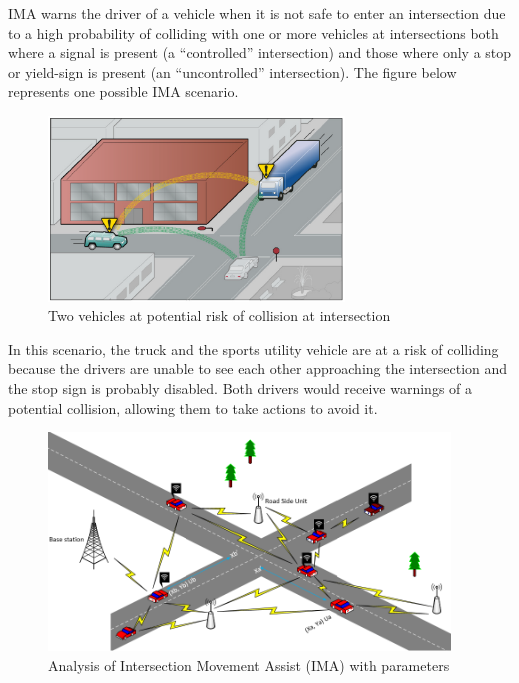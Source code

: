 \documentclass[12pt]{report}
\begin{document}
IMA warns the driver of a vehicle when it is not safe to enter an intersection due to a high probability of colliding with one or more vehicles at intersections both where a signal is present (a “controlled” intersection) and those where only a stop or yield-sign is present (an “uncontrolled” intersection). The figure below represents one possible IMA scenario.


\begin{figure}[!ht]
	\hfill\includegraphics[width=0.7\textwidth]{wow.png}\hspace*{\fill}
	\caption{Two vehicles at potential risk of collision at intersection}
	\label{fig}
\end{figure}

In this scenario, the truck and the sports utility vehicle are at a risk of colliding because the drivers are unable to see each other approaching  the intersection and the stop sign is probably disabled. Both drivers would receive warnings of a potential collision, allowing them to take actions to avoid it.


\begin{figure}[!htbp]
	\includegraphics[width=0.95\textwidth]{IMA.png}
	\caption{Analysis of Intersection Movement Assist (IMA) with parameters}
	\label{fig}
\end{figure}
\end{document}
